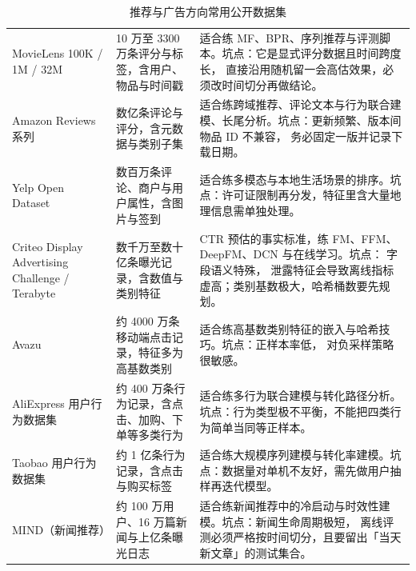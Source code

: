 \begin{table}[htbp]
\centering
\caption{推荐与广告方向常用公开数据集}
\label{tab:datasets-recsys}
\small
\begin{tabularx}{\textwidth}{L{2.1cm} L{2.4cm} Y}
\toprule
{} &  &  \\
\midrule
MovieLens 100K / 1M / 32M &
10 万至 3300 万条评分与标签，含用户、物品与时间戳 &
适合练 MF、BPR、序列推荐与评测脚本。坑点：它是显式评分数据且时间跨度长，
直接沿用随机留一会高估效果，必须改时间切分再做结论。 \\
Amazon Reviews 系列 &
数亿条评论与评分，含元数据与类别子集 &
适合练跨域推荐、评论文本与行为联合建模、长尾分析。坑点：更新频繁、版本间物品 ID 不兼容，
务必固定一版并记录下载日期。 \\
Yelp Open Dataset &
数百万条评论、商户与用户属性，含图片与签到 &
适合练多模态与本地生活场景的排序。坑点：许可证限制再分发，特征里含大量地理信息需单独处理。 \\
Criteo Display Advertising Challenge / Terabyte &
数千万至数十亿条曝光记录，含数值与类别特征 &
CTR 预估的事实标准，练 FM、FFM、DeepFM、DCN 与在线学习。坑点： 字段语义特殊，
泄露特征会导致离线指标虚高；类别基数极大，哈希桶数要先规划。 \\
Avazu &
约 4000 万条移动端点击记录，特征多为高基数类别 &
适合练高基数类别特征的嵌入与哈希技巧。坑点：正样本率低， 对负采样策略很敏感。 \\
AliExpress 用户行为数据集 &
约 400 万条行为记录，含点击、加购、下单等多类行为 &
适合练多行为联合建模与转化路径分析。坑点：行为类型极不平衡，不能把四类行为简单当同等正样本。 \\
Taobao 用户行为数据集 &
约 1 亿条行为记录，含点击与购买标签 &
适合练大规模序列建模与转化率建模。坑点：数据量对单机不友好，需先做用户抽样再迭代模型。 \\
MIND（新闻推荐） &
约 100 万用户、16 万篇新闻与上亿条曝光日志 &
适合练新闻推荐中的冷启动与时效性建模。坑点：新闻生命周期极短，
离线评测必须严格按时间切分，且要留出「当天新文章」的测试集合。 \\
\bottomrule
\end{tabularx}
\end{table}

